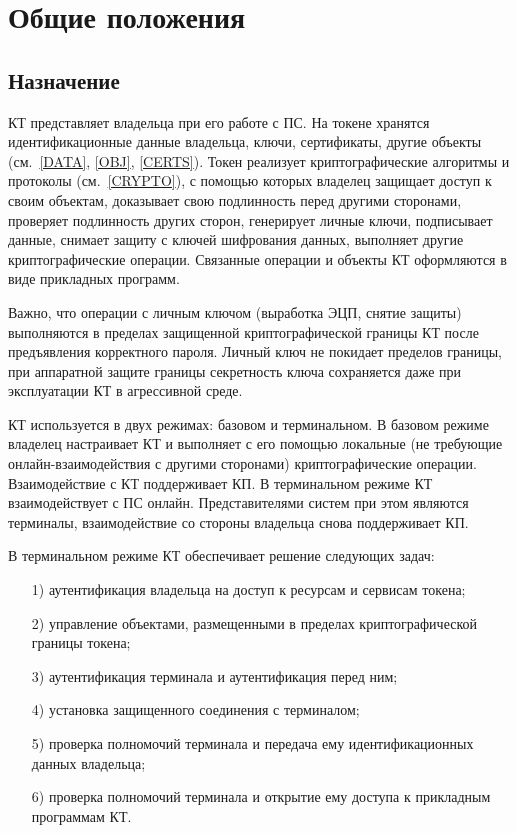 \chapter{Общие положения}\label{COMMON}

\section{Назначение}

КТ представляет владельца при его работе с ПС.
На токене хранятся идентификационные данные владельца, ключи, сертификаты, 
другие объекты (см.~\ref{DATA}, \ref{OBJ}, \ref{CERTS}). 
%
Токен реализует криптографические алгоритмы и протоколы (см.~\ref{CRYPTO}), 
с помощью которых владелец защищает доступ к своим объектам, 
доказывает свою подлинность перед другими сторонами, 
проверяет подлинность других сторон, генерирует личные ключи, подписывает 
данные, снимает защиту с ключей шифрования данных, выполняет другие 
криптографические операции.
%
Связанные операции и объекты КТ оформляются в виде прикладных программ. 

Важно, что операции с личным ключом (выработка ЭЦП, снятие защиты) выполняются  
в пределах защищенной криптографической границы КТ после предъявления 
корректного пароля. Личный ключ не покидает пределов границы, при аппаратной 
защите границы секретность ключа сохраняется даже при эксплуатации КТ в 
агрессивной среде.

КТ используется в двух режимах: базовом и терминальном.
%
В базовом режиме владелец настраивает КТ и выполняет с его помощью 
локальные (не требующие онлайн-взаимодействия с другими сторонами) 
криптографические операции. Взаимодействие с КТ поддерживает КП. 
%
В терминальном режиме КТ взаимодействует с ПС онлайн. Представителями систем 
при этом являются терминалы, взаимодействие со стороны владельца снова 
поддерживает КП.

В терминальном режиме КТ обеспечивает решение следующих задач: 
\begin{enumerate}
\item[1)]
аутентификация владельца на доступ к ресурсам и сервисам токена; 
\item[2)]
управление объектами, размещенными в пределах криптографической границы токена;
\item[3)]
аутентификация терминала и аутентификация перед ним;
\item[4)]
установка защищенного соединения с терминалом;
\item[5)]
проверка полномочий терминала и передача ему идентификационных данных владельца;
\item[6)]
проверка полномочий терминала и открытие ему доступа к прикладным программам КТ. 
\end{enumerate}

